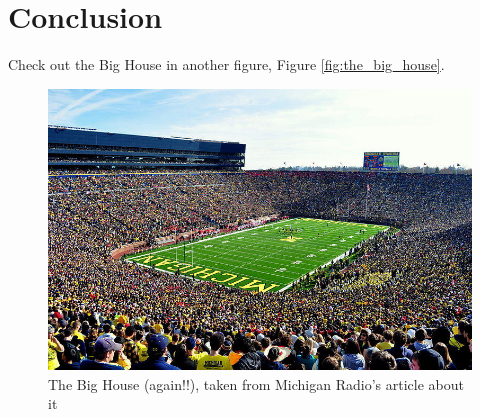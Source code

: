 \chapter{Conclusion}
\label{chpt:conclusion}

Check out the Big House in another figure, Figure \ref{fig:the_big_house}. \blindtext

\begin{figure}
    \centering
    \includegraphics{chapters/figures/the_big_house.jpeg}
    \caption{The Big House (again!!), taken from Michigan Radio's article about it \cite{the_big_house}}
    \label{fig:the_big_house_2}
\end{figure}